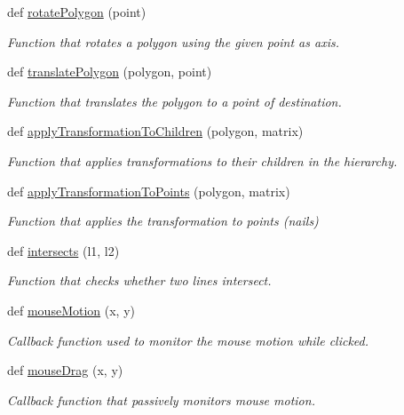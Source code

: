 \begin{DoxyCompactItemize}
def \hyperlink{namespacemain_abfe7963151804b73036937ad486f55ac}{rotate\+Polygon} (point)
\begin{DoxyCompactList}\small\item\em Function that rotates a polygon using the given point as axis. \end{DoxyCompactList}\item 
def \hyperlink{namespacemain_adeb2cd76f03836777dd43cb9bc133d89}{translate\+Polygon} (polygon, point)
\begin{DoxyCompactList}\small\item\em Function that translates the polygon to a point of destination. \end{DoxyCompactList}\item 
def \hyperlink{namespacemain_aeae47c61066756f699b19bf97f937370}{apply\+Transformation\+To\+Children} (polygon, matrix)
\begin{DoxyCompactList}\small\item\em Function that applies transformations to their children in the hierarchy. \end{DoxyCompactList}\item 
def \hyperlink{namespacemain_a69cc12fb1c27fecdfcac61f5d4e917b9}{apply\+Transformation\+To\+Points} (polygon, matrix)
\begin{DoxyCompactList}\small\item\em Function that applies the transformation to points (nails) \end{DoxyCompactList}\item 
def \hyperlink{namespacemain_afa0ac21cfc8ed3c2c3cfddd6ea6899b6}{intersects} (l1, l2)
\begin{DoxyCompactList}\small\item\em Function that checks whether two lines intersect. \end{DoxyCompactList}\item 
def \hyperlink{namespacemain_aac29b4e8c9fa3c64c062e76290492fb8}{mouse\+Motion} (x, y)
\begin{DoxyCompactList}\small\item\em Callback function used to monitor the mouse motion while clicked. \end{DoxyCompactList}\item 
def \hyperlink{namespacemain_a33eac5e1e174927a801f847ff8c2d484}{mouse\+Drag} (x, y)
\begin{DoxyCompactList}\small\item\em Callback function that passively monitors mouse motion. \end{DoxyCompactList}\item 

\end{DoxyCompactItemize}
